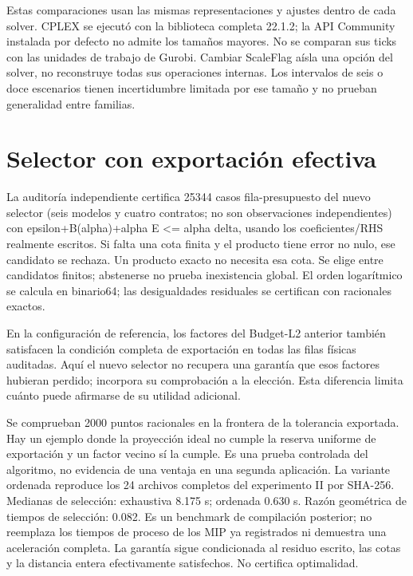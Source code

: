 \documentclass[a4paper,10pt]{article}
\begin{document}
Estas comparaciones usan las mismas representaciones y ajustes dentro de
cada solver. CPLEX se ejecutó con la biblioteca completa 22.1.2; la API
Community instalada por defecto no admite los tamaños mayores. No se
comparan sus ticks con las unidades de trabajo de Gurobi. Cambiar ScaleFlag
aísla una opción del solver, no reconstruye todas sus operaciones internas.
Los intervalos de seis o doce escenarios tienen incertidumbre limitada por
ese tamaño y no prueban generalidad entre familias.

\section*{Selector con exportación efectiva}

La auditoría independiente certifica 25344 casos fila-presupuesto del nuevo selector
(seis modelos y cuatro contratos; no son observaciones independientes)
con epsilon+B(alpha)+alpha E <= alpha delta, usando los coeficientes/RHS
realmente escritos. Si falta una cota finita y el producto tiene error
no nulo, ese candidato se rechaza. Un producto exacto no necesita esa cota.
Se elige entre candidatos finitos; abstenerse no prueba inexistencia global.
El orden logarítmico se calcula en binario64; las desigualdades residuales
se certifican con racionales exactos.

En la configuración de referencia, los factores del Budget-L2 anterior
también satisfacen la condición completa de exportación en todas las filas
físicas auditadas. Aquí el nuevo selector no recupera una garantía que
esos factores hubieran perdido; incorpora su comprobación a la elección.
Esta diferencia limita cuánto puede afirmarse de su utilidad adicional.

Se comprueban 2000 puntos racionales en la frontera de la tolerancia exportada.
Hay un ejemplo donde la proyección ideal no cumple la reserva uniforme
de exportación y un factor vecino sí la cumple. Es una prueba controlada
del algoritmo, no evidencia de una ventaja en una segunda aplicación.
La variante ordenada reproduce los 24 archivos completos del experimento II por SHA-256.
Medianas de selección: exhaustiva 8.175 s; ordenada 0.630 s.
Razón geométrica de tiempos de selección: 0.082.
Es un benchmark de compilación posterior; no reemplaza los tiempos de
proceso de los MIP ya registrados ni demuestra una aceleración completa.
La garantía sigue condicionada al residuo escrito, las cotas y la
distancia entera efectivamente satisfechos. No certifica optimalidad.
\end{document}

